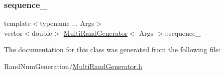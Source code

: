\subsubsection{\texorpdfstring{sequence\+\_\+}{sequence\_}}
{\footnotesize\ttfamily template$<$typename ... Args$>$ \\
vector$<$double$>$ \hyperlink{class_multi_rand_generator}{Multi\+Rand\+Generator}$<$ Args $>$\+::sequence\+\_\+\hspace{0.3cm}{\ttfamily [private]}}



The documentation for this class was generated from the following file\+:\begin{DoxyCompactItemize}
\item 
Rand\+Num\+Generation/\hyperlink{_multi_rand_generator_8h}{Multi\+Rand\+Generator.\+h}\end{DoxyCompactItemize}
